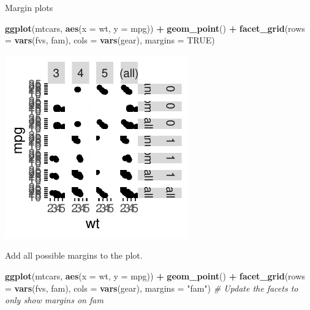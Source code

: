 \documentclass[
  ignorenonframetext,
]{beamer}
\newenvironment{Shaded}{\begin{snugshade}}{\end{snugshade}}
\newcommand{\AttributeTok}[1]{\textcolor[rgb]{0.13,0.29,0.53}{#1}}
\newcommand{\CommentTok}[1]{\textcolor[rgb]{0.56,0.35,0.01}{\textit{#1}}}
\newcommand{\ConstantTok}[1]{\textcolor[rgb]{0.56,0.35,0.01}{#1}}
\newcommand{\FunctionTok}[1]{\textcolor[rgb]{0.13,0.29,0.53}{\textbf{#1}}}
\newcommand{\NormalTok}[1]{#1}
\newcommand{\SpecialCharTok}[1]{\textcolor[rgb]{0.81,0.36,0.00}{\textbf{#1}}}
\newcommand{\StringTok}[1]{\textcolor[rgb]{0.31,0.60,0.02}{#1}}
\begin{document}
\begin{frame}[fragile]{Margin plots}

\begin{Shaded}
\begin{Highlighting}[]
\FunctionTok{ggplot}\NormalTok{(mtcars, }\FunctionTok{aes}\NormalTok{(}\AttributeTok{x =}\NormalTok{ wt, }\AttributeTok{y =}\NormalTok{ mpg)) }\SpecialCharTok{+} \FunctionTok{geom\_point}\NormalTok{() }\SpecialCharTok{+} \FunctionTok{facet\_grid}\NormalTok{(}\AttributeTok{rows =} \FunctionTok{vars}\NormalTok{(fvs,}
\NormalTok{    fam), }\AttributeTok{cols =} \FunctionTok{vars}\NormalTok{(gear), }\AttributeTok{margins =} \ConstantTok{TRUE}\NormalTok{)}
\end{Highlighting}
\end{Shaded}

\begin{center}\includegraphics[width=0.5\linewidth]{Figs/unnamed-chunk-99-1} \end{center}

Add all possible margins to the plot.


\begin{Shaded}
\begin{Highlighting}[]
\FunctionTok{ggplot}\NormalTok{(mtcars, }\FunctionTok{aes}\NormalTok{(}\AttributeTok{x =}\NormalTok{ wt, }\AttributeTok{y =}\NormalTok{ mpg)) }\SpecialCharTok{+} \FunctionTok{geom\_point}\NormalTok{() }\SpecialCharTok{+} \FunctionTok{facet\_grid}\NormalTok{(}\AttributeTok{rows =} \FunctionTok{vars}\NormalTok{(fvs,}
\NormalTok{    fam), }\AttributeTok{cols =} \FunctionTok{vars}\NormalTok{(gear), }\AttributeTok{margins =} \StringTok{"fam"}\NormalTok{)  }\CommentTok{\# Update the facets to only show margins on fam}
\end{Highlighting}
\end{Shaded}


\end{frame}
\end{document}
